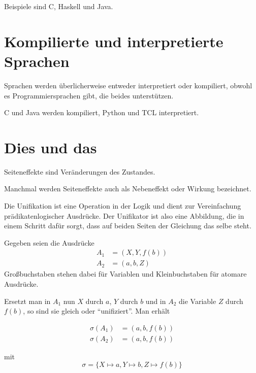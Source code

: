 Beispiele sind C, Haskell und Java.

\section{Kompilierte und interpretierte Sprachen}
Sprachen werden überlicherweise entweder interpretiert oder kompiliert,
obwohl es Programmiersprachen gibt, die beides unterstützen.

C und Java werden kompiliert, Python und TCL interpretiert.

\section{Dies und das}
\begin{definition}[Seiteneffekt]%
    Seiteneffekte sind Veränderungen des Zustandes.
\end{definition}

Manchmal werden Seiteneffekte auch als Nebeneffekt oder Wirkung bezeichnet.

\begin{definition}[Unifikation]%
    Die Unifikation ist eine Operation in der Logik und dient zur Vereinfachung
    prädikatenlogischer Ausdrücke.
    Der Unifikator ist also eine Abbildung, die in einem Schritt dafür sorgt, dass
    auf beiden Seiten der Gleichung das selbe steht.
\end{definition}

\begin{beispiel}
    Gegeben seien die Ausdrücke
    \begin{align*}
        A_1 &= \left(X, Y, f(b) \right)\\
        A_2 &= \left(a, b, Z \right)
    \end{align*}
    Großbuchstaben stehen dabei für Variablen und Kleinbuchstaben für atomare 
    Ausdrücke.

    Ersetzt man in $A_1$ nun $X$ durch $a$, $Y$ durch $b$ und in $A_2$ 
    die Variable $Z$ durch $f\left(b\right)$, so sind sie gleich oder 
    \enquote{unifiziert}. Man erhält

    \begin{align*}
        \sigma(A_1) &= \left(a, b, f(b) \right)\\
        \sigma(A_2) &= \left(a, b, f(b) \right)
    \end{align*}

    mit
    \[\sigma = \{X \mapsto a, Y \mapsto b, Z \mapsto f(b)\}\]
\end{beispiel}

